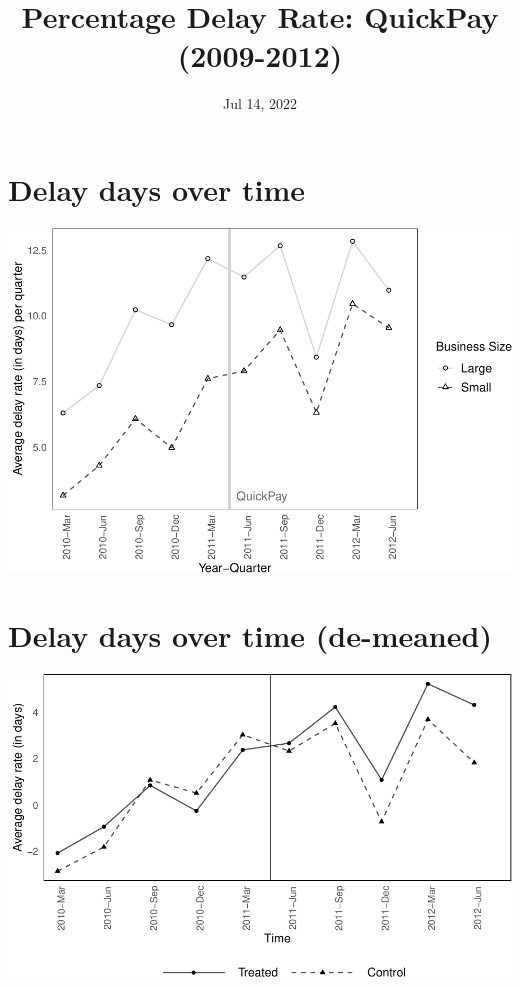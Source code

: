 \documentclass[
]{article}
\title{Percentage Delay Rate: QuickPay (2009-2012)}
\author{}
\date{\vspace{-2.5em}Jul 14, 2022}
\begin{document}
\maketitle

\hypertarget{delay-days-over-time}{%
\section{Delay days over time}\label{delay-days-over-time}}

\includegraphics{qp_first_pc_delay-2_files/figure-latex/plot_delay_days-1.pdf}

\hypertarget{delay-days-over-time-de-meaned}{%
\section{Delay days over time
(de-meaned)}\label{delay-days-over-time-de-meaned}}

\includegraphics{qp_first_pc_delay-2_files/figure-latex/demeaned_plot_delay_days-1.pdf}
\end{document}
